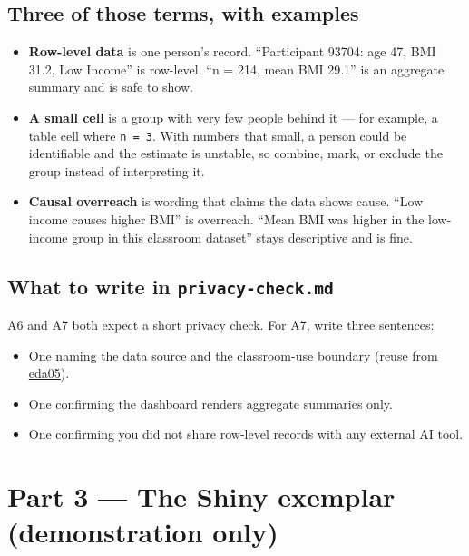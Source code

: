 \documentclass[
  letterpaper,
  DIV=11,
  numbers=noendperiod,
  oneside]{scrreprt}
\providecommand{\tightlist}{%
  \setlength{\itemsep}{0pt}\setlength{\parskip}{0pt}}
\begin{document}
\subsection*{Three of those terms, with
examples}\label{three-of-those-terms-with-examples}

\begin{itemize}
\tightlist
\item
  \textbf{Row-level data} is one person's record. ``Participant 93704:
  age 47, BMI 31.2, Low Income'' is row-level. ``n = 214, mean BMI
  29.1'' is an aggregate summary and is safe to show.
\item
  \textbf{A small cell} is a group with very few people behind it ---
  for example, a table cell where \texttt{n\ =\ 3}. With numbers that
  small, a person could be identifiable and the estimate is unstable, so
  combine, mark, or exclude the group instead of interpreting it.
\item
  \textbf{Causal overreach} is wording that claims the data shows cause.
  ``Low income causes higher BMI'' is overreach. ``Mean BMI was higher
  in the low-income group in this classroom dataset'' stays descriptive
  and is fine.
\end{itemize}

\subsection*{\texorpdfstring{What to write in
\texttt{privacy-check.md}}{What to write in privacy-check.md}}\label{what-to-write-in-privacy-check.md}

A6 and A7 both expect a short privacy check. For A7, write three
sentences:

\begin{itemize}
\tightlist
\item
  One naming the data source and the classroom-use boundary (reuse from
  \hyperref[four-audit-categories-for-ai-drafted-eda]{eda05}).
\item
  One confirming the dashboard renders aggregate summaries only.
\item
  One confirming you did not share row-level records with any external
  AI tool.
\end{itemize}

\section*{Part 3 --- The Shiny exemplar (demonstration
only)}\label{part-3-the-shiny-exemplar-demonstration-only}
\end{document}
